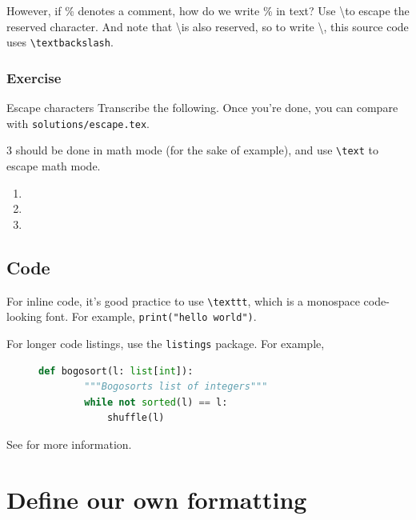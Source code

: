 \documentclass{article}
\begin{document}
However, if \% denotes a comment, how do we write \% in text? Use \textbackslash to escape the reserved character. And note that \textbackslash is also reserved, so to write \textbackslash, this source code uses \texttt{\textbackslash textbackslash}.

\subsubsection{Exercise}

\begin{exercise}{Escape characters}{}
    Transcribe the following. Once you're done, you can compare with \texttt{solutions/escape.tex}.

    

    3 should be done in math mode (for the sake of example), and use \texttt{\textbackslash text} to escape math mode.
    
\end{exercise}

\begin{solution}{}{}
    \begin{enumerate}
        \item 
        \item 
        \item
    \end{enumerate}
\end{solution}

\subsection{Code}

For inline code, it's good practice to use \texttt{\textbackslash texttt}, which is a monospace code-looking font. For example, \texttt{print("hello world")}.

For longer code listings, use the \texttt{listings} package. For example,

\begin{figure}[h]
    \centering
    \begin{lstlisting}[language=Python]
    def bogosort(l: list[int]):
        """Bogosorts list of integers"""
        while not sorted(l) == l:
            shuffle(l)
    \end{lstlisting} 
\end{figure}

See \cite{overleaf_code} for more information.

\section{Define our own formatting}
\end{document}
